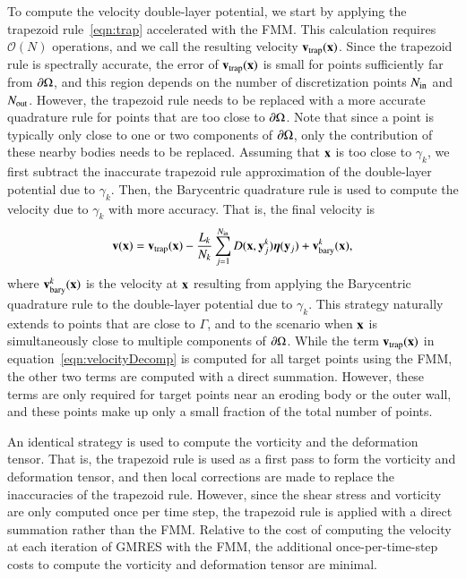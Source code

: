 \documentclass[preprint,10pt]{elsarticle}
\begin{document}
To compute the velocity double-layer potential, we start by applying the
trapezoid rule~\eqref{eqn:trap} accelerated with the FMM.  This
calculation requires $\mathcal{O}(N)$ operations, and we call the
resulting velocity ${\mathbf{v}}_{\mathrm{trap}}({\mathbf{x}})$.  Since the trapezoid rule is
spectrally accurate, the error of ${\mathbf{v}}_{\mathrm{trap}}({\mathbf{x}})$ is small for points
sufficiently far from ${\partial}\Omega$, and this region depends on the number
of discretization points $N_{\mathrm{in}}$ and $N_{\mathrm{out}}$.  However, the trapezoid
rule needs to be replaced with a more accurate quadrature rule for
points that are too close to ${\partial}\Omega$.  Note that since a point is
typically only close to one or two components of ${\partial}\Omega$, only the
contribution of these nearby bodies needs to be replaced.  Assuming that
${\mathbf{x}}$ is too close to $\gamma_k$, we first subtract the inaccurate
trapezoid rule approximation of the double-layer potential due to
$\gamma_k$.  Then, the Barycentric quadrature rule is used to compute
the velocity due to $\gamma_k$ with more accuracy.  That is, the final
velocity is
\begin{align}
  {\mathbf{v}}({\mathbf{x}}) = {\mathbf{v}}_{\mathrm{trap}}({\mathbf{x}}) - \frac{L_k}{N_k} \sum_{j=1}^{N_{\mathrm{in}}} 
    D({\mathbf{x}},{\mathbf{y}}^k_j) {\boldsymbol\eta}({\mathbf{y}}_j) + {\mathbf{v}}^k_{\mathrm{bary}}({\mathbf{x}}),
  \label{eqn:velocityDecomp}
\end{align}
where ${\mathbf{v}}^k_{\mathrm{bary}}({\mathbf{x}})$ is the velocity at ${\mathbf{x}}$ resulting from
applying the Barycentric quadrature rule to the double-layer potential
due to $\gamma_k$.  This strategy naturally extends to points that are
close to $\Gamma$, and to the scenario when ${\mathbf{x}}$ is simultaneously
close to multiple components of ${\partial}\Omega$.  While the term
${\mathbf{v}}_{\mathrm{trap}}({\mathbf{x}})$ in equation~\eqref{eqn:velocityDecomp} is computed for
all target points using the FMM, the other two terms are computed with a
direct summation.  However, these terms are only required for target
points near an eroding body or the outer wall, and these points make up
only a small fraction of the total number of points.  

An identical strategy is used to compute the vorticity and the
deformation tensor.  That is, the trapezoid rule is used as a first pass
to form the vorticity and deformation tensor, and then local corrections
are made to replace the inaccuracies of the trapezoid rule.  However,
since the shear stress and vorticity are only computed once per time
step, the trapezoid rule is applied with a direct summation rather than
the FMM.  Relative to the cost of computing the velocity at each
iteration of GMRES with the FMM, the additional once-per-time-step costs
to compute the vorticity and deformation tensor are minimal.
\end{document}
